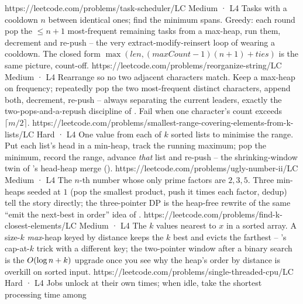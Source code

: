 \begin{mixedset}
    {https://leetcode.com/problems/task-scheduler/}{LC Medium · L4}
    {Tasks with a cooldown $n$ between identical ones; find the minimum spans. Greedy: each round pop the
    $\le n{+}1$ most-frequent remaining tasks from a max-heap, run them, decrement and re-push -- the very
    extract-modify-reinsert loop of  wearing a cooldown. The closed form
    $\max(\mathit{len},(\mathit{maxCount}-1)(n+1)+\mathit{ties})$ is the same picture, count-off.}
    {https://leetcode.com/problems/reorganize-string/}{LC Medium · L4}
    {Rearrange so no two adjacent characters match. Keep a max-heap on frequency; repeatedly pop the two
    most-frequent distinct characters, append both, decrement, re-push -- always separating the current
    leaders, exactly the two-pops-and-a-repush discipline of . Fail when one character's
    count exceeds $\lceil m/2\rceil$.}
    {https://leetcode.com/problems/smallest-range-covering-elements-from-k-lists/}{LC Hard · L4}
    {One value from each of $k$ sorted lists to minimise the range. Put each list's head in a min-heap,
    track the running maximum; pop the minimum, record the range, advance \emph{that} list and re-push --
    the shrinking-window twin of 's head-heap merge ().}
    {https://leetcode.com/problems/ugly-number-ii/}{LC Medium · L4}
    {The $n$-th number whose only prime factors are $2,3,5$. Three min-heaps seeded at $1$ (pop the smallest
    product, push it times each factor, dedup) tell the story directly; the three-pointer DP is the
    heap-free rewrite of the same ``emit the next-best in order'' idea of .}
    {https://leetcode.com/problems/find-k-closest-elements/}{LC Medium · L4}
    {The $k$ values nearest to $x$ in a sorted array. A size-$k$ \emph{max}-heap keyed by distance keeps the
    $k$ best and evicts the farthest -- 's cap-at-$k$ trick with a different key; the
    two-pointer window after a binary search is the $O(\log n+k)$ upgrade once you see why the heap's
    order by distance is overkill on sorted input.}
    {https://leetcode.com/problems/single-threaded-cpu/}{LC Hard · L4}
    {Jobs unlock at their own times; when idle, take the shortest processing time among
}
\end{mixedset}
